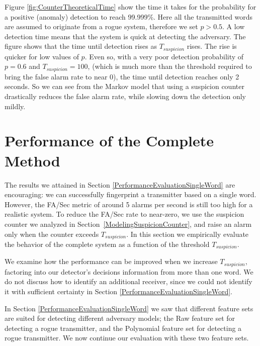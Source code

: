 \documentclass[compsoc,conference,a4paper,10pt,times]{IEEEtran}
\newcommand{\level}[1]{\section{#1}}
\newcommand{\level}[1]{\chapter{#1}}
\begin{document}
  Figure \ref{fig:CounterTheoreticalTime} show the time it takes for the probability for a positive (anomaly) detection to reach 99.999\%. Here all the transmitted words are assumed to originate from a rogue system, therefore we set $p > 0.5$. A low detection time means that the system is quick at detecting the adversary. The figure shows that the time until detection rises as $T_{suspicion}$ rises. The rise is quicker for low values of $p$. Even so, with a very poor detection probability of $p = 0.6$ and $T_{suspicion} = 100$, (which is much more than the threshold required to bring the false alarm rate to near 0), the time until detection reaches only 2 seconds. So we can see from the Markov model that using a suspicion counter drastically reduces the false alarm rate, while slowing down the detection only mildly.
   
\level{Performance of the Complete Method} \label{PerformanceEvaluationCompleteMethod}

  The results we attained in Section \ref{PerformanceEvaluationSingleWord} are encouraging: we can successfully fingerprint a transmitter based on a single word. However, the FA/Sec metric of around 5 alarms per second is still too high for a realistic system. To reduce the FA/Sec rate to near-zero, we use the suspicion counter we analyzed in Section~\ref{ModelingSuspicionCounter}, and raise an alarm only when the counter exceeds $T_{suspicion}$. In this section we empirically evaluate the behavior of the complete system as a function of the threshold $T_{suspicion}$.
  
  We examine how the performance can be improved when we increase $T_{suspicion}$, factoring into our detector's decisions information from more than one word.  We do not discuss how to identify an additional receiver, since we could not identify it with sufficient certainty in Section \ref{PerformanceEvaluationSingleWord}.
  
  In Section \ref{PerformanceEvaluationSingleWord} we saw that different feature sets are suited for detecting different adversary models; the Raw feature set for detecting a rogue transmitter, and the Polynomial feature set for detecting a rogue transmitter. We now continue our evaluation with these two feature sets.
  
\end{document}
